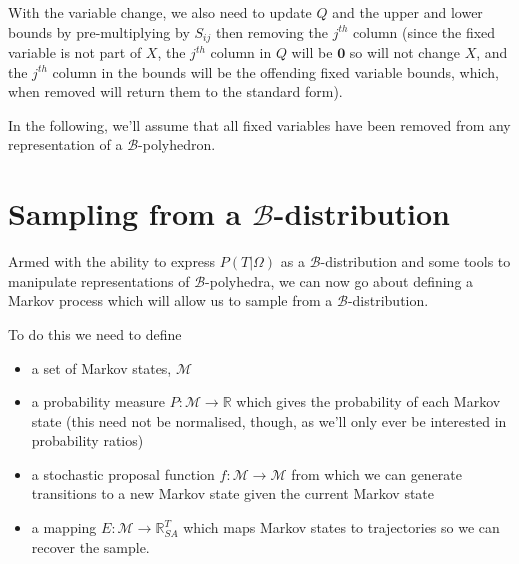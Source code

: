 \documentclass{article}
\begin{document}
With the variable change, we also need to update $Q$ and the upper and lower bounds by pre-multiplying by $S_{ij}$ then removing the $j^{th}$ column (since the fixed variable is not part of $X$, the $j^{th}$ column in $Q$ will be $\mathbf{0}$ so will not change $X$, and the $j^{th}$ column in the bounds will be the offending fixed variable bounds, which, when removed will return them to the standard form).

In the following, we'll assume that all fixed variables have been removed from any representation of a $\mathcal{B}$-polyhedron.

\section{Sampling from a $\mathcal{B}$-distribution}

Armed with the ability to express $P(T|\Omega)$ as a $\mathcal{B}$-distribution and some tools to manipulate representations of $\mathcal{B}$-polyhedra, we can now go about defining a Markov process which will allow us to sample from a $\mathcal{B}$-distribution.

To do this we need to define
\begin{itemize}
\item a set of Markov states, $\mathcal{M}$

\item a probability measure $P: \mathcal{M} \to \mathbb{R}$ which gives the probability of each Markov state (this need not be normalised, though, as we'll only ever be interested in probability ratios)

\item a stochastic proposal function $f:\mathcal{M} \to \mathcal{M}$ from which we can generate transitions to a new Markov state given the current Markov state

\item a mapping $E:\mathcal{M} \to \mathbb{R}^T_{SA}$ which maps Markov states to trajectories so we can recover the sample.
\end{itemize}
\end{document}
